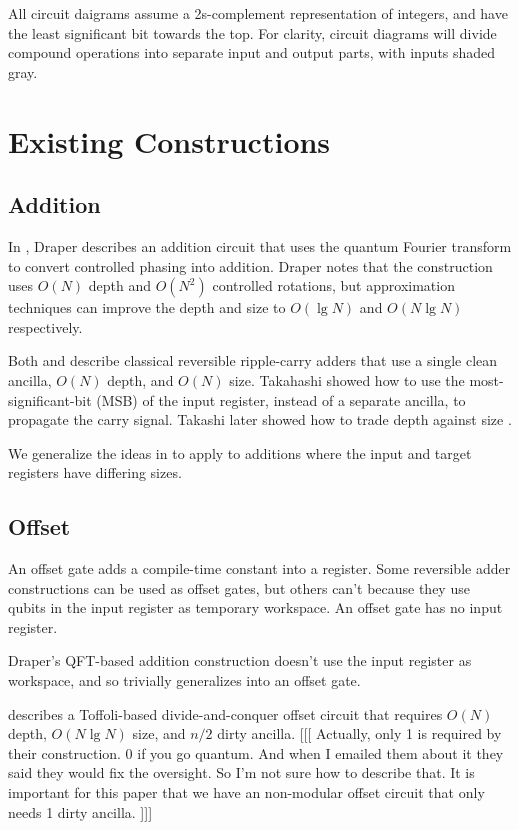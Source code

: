 \documentclass[twocolumn]{article}
\begin{document}
All circuit daigrams assume a 2s-complement representation of integers, and have the least significant bit towards the top.
For clarity, circuit diagrams will divide compound operations into separate input and output parts, with inputs shaded gray.

\section{Existing Constructions} \label{sec:review}

\subsection{Addition}

In \cite{draper2000}, Draper describes an addition circuit that uses the quantum Fourier transform to convert controlled phasing into addition.
Draper notes that the construction uses $O(N)$ depth and $O(N^2)$ controlled rotations, but approximation techniques \cite{barenco1996} \cite{cleve2000} can improve the depth and size to $O(\lg N)$ and $O(N \lg N)$ respectively.

Both \cite{cuccaro2004} and \cite{van2004} describe classical reversible ripple-carry adders that use a single clean ancilla, $O(N)$ depth, and $O(N)$ size.
Takahashi \cite{takahashi2005} showed how to use the most-significant-bit (MSB) of the input register, instead of a separate ancilla, to propagate the carry signal.
Takashi later showed how to trade depth against size \cite{takahashi2009}.

We generalize the ideas in \cite{takahashi2005} to apply to additions where the input and target registers have differing sizes.

\subsection{Offset}

An offset gate adds a compile-time constant into a register.
Some reversible adder constructions can be used as offset gates, but others can't because they use qubits in the input register as temporary workspace.
An offset gate has no input register.

Draper's QFT-based addition construction \cite{draper2000} doesn't use the input register as workspace, and so trivially generalizes into an offset gate.

\cite{haner2016} describes a Toffoli-based divide-and-conquer offset circuit that requires $O(N)$ depth, $O(N \lg N)$ size, and $n/2$ dirty ancilla.
[[[ Actually, only 1 is required by their construction. 0 if you go quantum. And when I emailed them about it they said they would fix the oversight. So I'm not sure how to describe that. It is important for this paper that we have an non-modular offset circuit that only needs 1 dirty ancilla. ]]]
\end{document}
